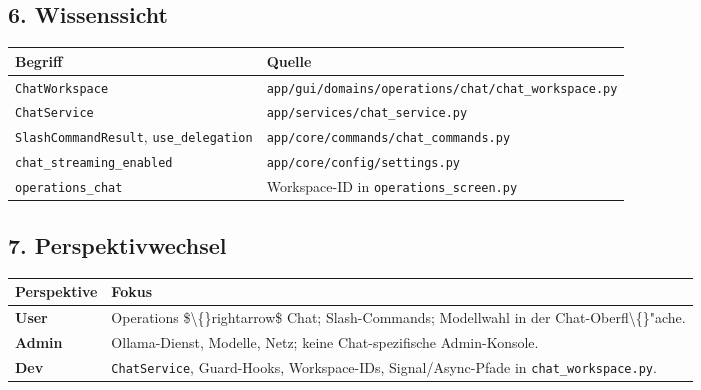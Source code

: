 \subsection{6. Wissenssicht}

\begin{center}
\begin{tabular}{ll}
\hline
Begriff & Quelle \\
\hline
\texttt{ChatWorkspace} & \texttt{app/gui/domains/operations/chat/chat\_workspace.py} \\
\texttt{ChatService} & \texttt{app/services/chat\_service.py} \\
\texttt{SlashCommandResult}, \texttt{use\_delegation} & \texttt{app/core/commands/chat\_commands.py} \\
\texttt{chat\_streaming\_enabled} & \texttt{app/core/config/settings.py} \\
\texttt{operations\_chat} & Workspace-ID in \texttt{operations\_screen.py} \\
\hline
\end{tabular}
\end{center}

\subsection{7. Perspektivwechsel}

\begin{center}
\begin{tabular}{ll}
\hline
Perspektive & Fokus \\
\hline
\textbf{User} & Operations \$\textbackslash\{\}rightarrow\$ Chat; Slash-Commands; Modellwahl in der Chat-Oberfl\textbackslash\{\}"ache. \\
\textbf{Admin} & Ollama-Dienst, Modelle, Netz; keine Chat-spezifische Admin-Konsole. \\
\textbf{Dev} & \texttt{ChatService}, Guard-Hooks, Workspace-IDs, Signal/Async-Pfade in \texttt{chat\_workspace.py}. \\
\hline
\end{tabular}
\end{center}
